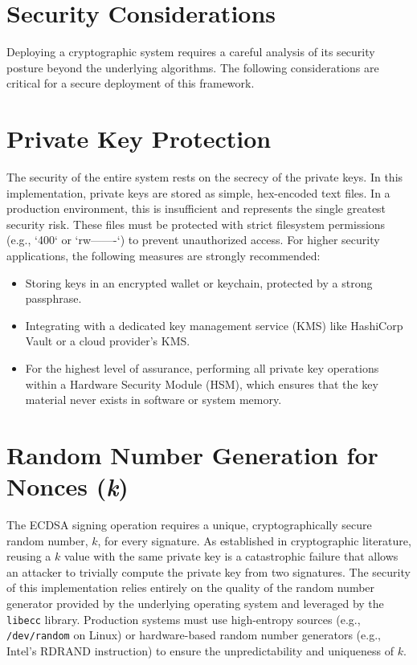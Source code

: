 \section{Security Considerations}
Deploying a cryptographic system requires a careful analysis of its security posture beyond the underlying algorithms. The following considerations are critical for a secure deployment of this framework.

\section{Private Key Protection}
The security of the entire system rests on the secrecy of the private keys. In this implementation, private keys are stored as simple, hex-encoded text files. In a production environment, this is insufficient and represents the single greatest security risk. These files must be protected with strict filesystem permissions (e.g., `400` or `rw-------`) to prevent unauthorized access. For higher security applications, the following measures are strongly recommended:
\begin{itemize}
	\item Storing keys in an encrypted wallet or keychain, protected by a strong passphrase.
	\item Integrating with a dedicated key management service (KMS) like HashiCorp Vault or a cloud provider's KMS.
	\item For the highest level of assurance, performing all private key operations within a Hardware Security Module (HSM), which ensures that the key material never exists in software or system memory.
\end{itemize}

\section{Random Number Generation for Nonces (\textit{k})}
The ECDSA signing operation requires a unique, cryptographically secure random number, $k$, for every signature. As established in cryptographic literature, reusing a $k$ value with the same private key is a catastrophic failure that allows an attacker to trivially compute the private key from two signatures. The security of this implementation relies entirely on the quality of the random number generator provided by the underlying operating system and leveraged by the \texttt{libecc} library. Production systems must use high-entropy sources (e.g., \texttt{/dev/random} on Linux) or hardware-based random number generators (e.g., Intel's RDRAND instruction) to ensure the unpredictability and uniqueness of $k$.

